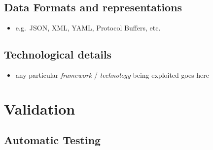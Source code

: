 \documentclass{scrartcl}
\begin{document}
\subsection{Data Formats and representations}\label{data-formats}

\begin{itemize}
      \item e.g.~JSON, XML, YAML, Protocol Buffers, etc.
\end{itemize}

\subsection{Technological details}\label{technological-details}

\begin{itemize}
      \item any particular \emph{framework} / \emph{technology} being exploited
            goes here
\end{itemize}

\section{Validation}\label{validation}

\subsection{Automatic Testing}\label{automatic-testing}
\end{document}
